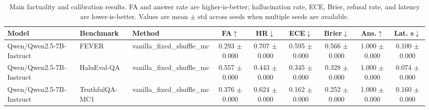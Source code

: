 \begin{table}[t]
\centering
\caption{Main factuality and calibration results. FA and answer rate are higher-is-better; hallucination rate, ECE, Brier, refusal rate, and latency are lower-is-better. Values are mean $\pm$ std across seeds when multiple seeds are available.}
\label{tab:main_results}
\small
\begin{tabular}{lllcccccc}
\toprule
Model & Benchmark & Method & FA$\uparrow$ & HR$\downarrow$ & ECE$\downarrow$ & Brier$\downarrow$ & Ans.$\uparrow$ & Lat. s$\downarrow$ \\
\midrule
Qwen/Qwen2.5-7B-Instruct & FEVER & vanilla\_fixed\_shuffle\_mc & 0.293 $\pm$ 0.000 & 0.707 $\pm$ 0.000 & 0.595 $\pm$ 0.000 & 0.566 $\pm$ 0.000 & 1.000 $\pm$ 0.000 & 0.100 $\pm$ 0.000 \\
Qwen/Qwen2.5-7B-Instruct & HaluEval-QA & vanilla\_fixed\_shuffle\_mc & 0.557 $\pm$ 0.000 & 0.443 $\pm$ 0.000 & 0.345 $\pm$ 0.000 & 0.328 $\pm$ 0.000 & 1.000 $\pm$ 0.000 & 0.074 $\pm$ 0.000 \\
Qwen/Qwen2.5-7B-Instruct & TruthfulQA-MC1 & vanilla\_fixed\_shuffle\_mc & 0.376 $\pm$ 0.000 & 0.624 $\pm$ 0.000 & 0.162 $\pm$ 0.000 & 0.252 $\pm$ 0.000 & 1.000 $\pm$ 0.000 & 0.160 $\pm$ 0.000 \\
\bottomrule
\end{tabular}
\end{table}
